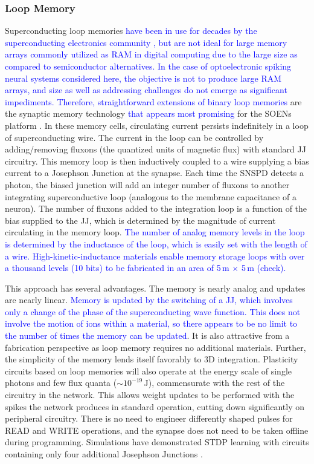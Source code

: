 \documentclass[twocolumn]{article}
\begin{document}
\subsubsection{Loop Memory}
Superconducting loop memories \textcolor{blue}{have been in use for decades by the superconducting electronics community \cite{vatu1998,ka1999}, but are not ideal for large memory arrays commonly utilized as RAM in digital computing due to the large size as compared to semiconductor alternatives. In the case of optoelectronic spiking neural systems considered here, the objective is not to produce large RAM arrays, and size as well as addressing challenges do not emerge as significant impediments. Therefore, straightforward extensions of binary loop memories} are the synaptic memory technology \textcolor{blue}{that appears most promising} for the SOENs platform \cite{sh2018,shainline2019superconducting}. In these memory cells, circulating current persists indefinitely in a loop of superconducting wire. The current in the loop can be controlled by adding/removing fluxons (the quantized units of magnetic flux) with standard JJ circuitry. This memory loop is then inductively coupled to a wire supplying a bias current to a Josephson Junction at the synapse. Each time the SNSPD detects a photon, the biased junction will add an integer number of fluxons to another integrating superconductive loop (analogous to the membrane capacitance of a neuron). The number of fluxons added to the integration loop is a function of the bias supplied to the JJ, which is determined by the magnitude of current circulating in the memory loop. \textcolor{blue}{The number of analog memory levels in the loop is determined by the inductance of the loop, which is easily set with the length of a wire. High-kinetic-inductance materials \cite{} enable memory storage loops with over a thousand levels (10 bits) to be fabricated in an area of 5\,\textmu m $\times$ 5\,\textmu m (check).}

This approach has several advantages. The memory is nearly analog and updates are nearly linear. \textcolor{blue}{Memory is updated by the switching of a JJ, which involves only a change of the phase of the superconducting wave function. This does not involve the motion of ions within a material, so there appears to be no limit to the number of times the memory can be updated}. It is also attractive from a fabrication perspective as loop memory requires no additional materials. Further, the simplicity of the memory lends itself favorably to 3D integration. Plasticity circuits based on loop memories will also operate at the energy scale of single photons and few flux quanta ($\sim 10^{-19}$\,J), commensurate with the rest of the circuitry in the network. This allows weight updates to be performed with the spikes the network produces in standard operation, cutting down significantly on peripheral circuitry. There is no need to engineer differently shaped pulses for READ and WRITE operations, and the synapse does not need to be taken offline during programming. Simulations have demonstrated STDP learning with circuits containing only four additional Josephson Junctions \cite{shainline2019superconducting}. 
\end{document}
